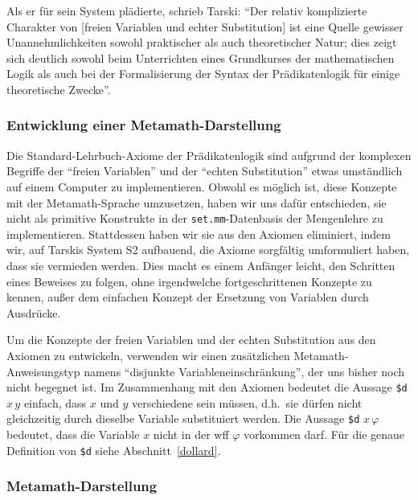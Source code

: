 Als er für sein System plädierte, schrieb Tarski: "`Der relativ komplizierte Charakter von [freien Variablen und echter Substitution] ist eine Quelle gewisser Unannehmlichkeiten sowohl praktischer als auch theoretischer Natur; dies zeigt sich deutlich sowohl beim Unterrichten eines Grundkurses der mathematischen Logik als auch bei der Formalisierung der Syntax der Prädikatenlogik für einige theoretische Zwecke"'\cite[S.~61]{Tarski1965}.

\subsubsection{Entwicklung einer Metamath-Darstellung}

Die Standard-Lehrbuch-Axiome der Prädikatenlogik sind aufgrund der komplexen Begriffe der "`freien Variablen"' und der "`echten Substitution"' etwas umständlich auf einem Computer zu implementieren. Obwohl es möglich ist, diese Konzepte mit der Metamath-Sprache umzusetzen, haben wir uns dafür entschieden, sie nicht als primitive Konstrukte in der \texttt{set.mm}-Datenbasis der Mengenlehre zu implementieren.  Stattdessen haben wir sie aus den Axiomen eliminiert, indem wir, auf Tarskis System S2 aufbauend, die Axiome sorgfältig umformuliert haben, dass sie vermieden werden.  Dies macht es einem Anfänger leicht, den Schritten eines Beweises zu folgen, ohne irgendwelche fortgeschrittenen Konzepte zu kennen, außer dem einfachen Konzept der Ersetzung von Variablen durch Ausdrücke.

Um die Konzepte der freien Variablen und der echten Substitution aus den Axiomen zu entwickeln, verwenden wir einen zusätzlichen Metamath-Anweisungstyp namens "`disjunkte Variableneinschränkung"', der uns bisher noch nicht begegnet ist.  Im Zusammenhang mit den Axiomen bedeutet die Aussage \texttt{\$d} $ x\, y$ einfach, dass $x$ und $y$ verschiedene sein müssen, d.h.\ sie dürfen nicht gleichzeitig durch dieselbe Variable substituiert werden.  Die Aussage \texttt{\$d} $ x\, \varphi$ bedeutet, dass die Variable $x$ nicht in der wff $\varphi$ vorkommen darf.  Für die genaue Definition von \texttt{\$d} siehe Abschnitt~\ref{dollard}.

\subsubsection{Metamath-Darstellung}

